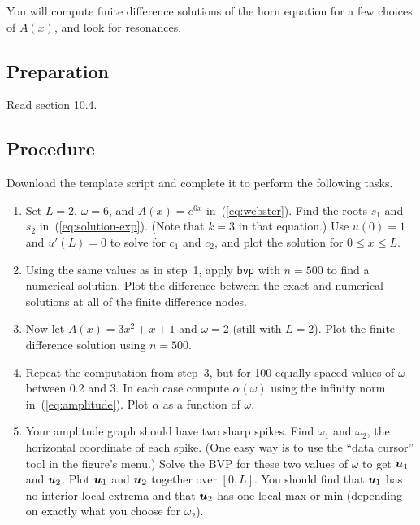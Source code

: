 \documentclass[11pt,twoside]{article}
\begin{document}
You will compute finite difference solutions of the horn equation for a few choices of $A(x)$, and look for resonances.

\subsection*{Preparation}

Read section 10.4. 


\subsection*{Procedure}

Download the template script and complete it to perform the following tasks.

\begin{enumerate}
    \item Set $L=2$, $\omega=6$, and $A(x)=e^{6x}$  in~(\ref{eq:webster}). Find the roots $s_1$ and $s_2$ in~(\ref{eq:solution-exp}). (Note that $k=3$ in that equation.) Use $u(0)=1$ and $u'(L)=0$ to solve for $c_1$ and $c_2$, and plot the solution for $0\le x \le L$. 
    \item Using the same values as in step~1, apply \texttt{bvp} with $n=500$ to find a numerical solution. Plot the difference between the exact and numerical solutions at all of the finite difference nodes. 
    \item Now let $A(x)=3x^2+x+1$ and $\omega=2$ (still with $L=2$). Plot the finite difference solution using $n=500$. 
    \item Repeat the computation from step~3, but for 100 equally spaced values of $\omega$ between 0.2 and 3. In each case compute $\alpha(\omega)$ using the infinity norm in~(\ref{eq:amplitude}). Plot $\alpha$ as a function of $\omega$.
    \item Your amplitude graph should have two sharp spikes. Find $\omega_1$ and $\omega_2$, the horizontal coordinate of each spike. (One easy way is to use the ``data cursor'' tool in the figure's menu.) Solve the BVP for these two values of $\omega$ to get $\bm{u}_1$ and $\bm{u}_2$. Plot $\bm{u}_1$ and $\bm{u}_2$ together over $[0,L]$. You should find that $\bm{u}_1$ has no interior local extrema and that $\bm{u}_2$ has one local max or min (depending on exactly what you choose for $\omega_2$). 
\end{enumerate}
\end{document}
